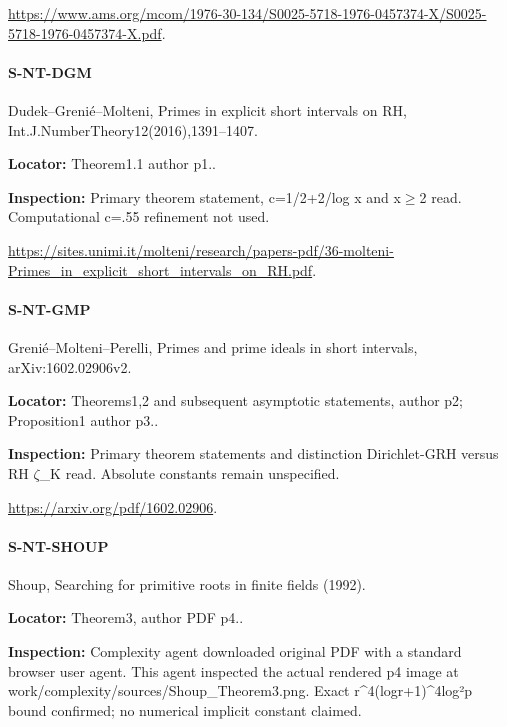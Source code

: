 \documentclass[11pt,a4paper]{article}
\begin{document}
\url{https://www.ams.org/mcom/1976-30-134/S0025-5718-1976-0457374-X/S0025-5718-1976-0457374-X.pdf}.

\paragraph{S-NT-DGM} Dudek–\allowbreak{}Grenié–\allowbreak{}Molteni, Primes in explicit short intervals on RH, Int.\allowbreak{}J.\allowbreak{}NumberTheory12(2016),1391–\allowbreak{}1407.

\textbf{Locator:} Theorem1.\allowbreak{}1 author p1.\allowbreak{}.

\textbf{Inspection:} Primary theorem statement, c=1/\allowbreak{}2+2/\allowbreak{}log x and x\ensuremath{\ge}2 read.\allowbreak{} Computational c=.\allowbreak{}55 refinement not used.\allowbreak{}

\url{https://sites.unimi.it/molteni/research/papers-pdf/36-molteni-Primes_in_explicit_short_intervals_on_RH.pdf}.

\paragraph{S-NT-GMP} Grenié–\allowbreak{}Molteni–\allowbreak{}Perelli, Primes and prime ideals in short intervals, arXiv:\allowbreak{}1602.\allowbreak{}02906v2.

\textbf{Locator:} Theorems1,2 and subsequent asymptotic statements, author p2; Proposition1 author p3.\allowbreak{}.

\textbf{Inspection:} Primary theorem statements and distinction Dirichlet-GRH versus RH \ensuremath{\zeta}\_\allowbreak{}K read.\allowbreak{} Absolute constants remain unspecified.\allowbreak{}

\url{https://arxiv.org/pdf/1602.02906}.

\paragraph{S-NT-SHOUP} Shoup, Searching for primitive roots in finite fields (1992).

\textbf{Locator:} Theorem3, author PDF p4.\allowbreak{}.

\textbf{Inspection:} Complexity agent downloaded original PDF with a standard browser user agent.\allowbreak{} This agent inspected the actual rendered p4 image at work/\allowbreak{}complexity/\allowbreak{}sources/\allowbreak{}Shoup\_\allowbreak{}Theorem3.\allowbreak{}png.\allowbreak{} Exact r\textasciicircum{}4(logr+1)\textasciicircum{}4log²p bound confirmed; no numerical implicit constant claimed.\allowbreak{}
\end{document}
